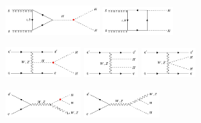 \begin{figure}[ht]
\captionsetup[subfigure]{justification=centering}
    \centering
      \begin{subfigure}{\textwidth}
  \centering
          \caption{}
\includegraphics[width=0.40\textwidth]{Figures/HiggsPairProduction/ggf1.png}
\includegraphics[width=0.30\textwidth]{Figures/HiggsPairProduction/ggf2.png}\\
      \end{subfigure}
      \begin{subfigure}{\textwidth}
  \centering
          \caption{}
\includegraphics[width=0.32\textwidth]{Figures/HiggsPairProduction/vbf2.png}
\includegraphics[width=0.23\textwidth]{Figures/HiggsPairProduction/vbf1.png}
\includegraphics[width=0.23\textwidth]{Figures/HiggsPairProduction/vbf3.png}\\
      \end{subfigure}
      \begin{subfigure}{\textwidth}
  \centering
          \caption{}
\includegraphics[width=0.32\textwidth]{Figures/HiggsPairProduction/vhh1.png}
\includegraphics[width=0.32\textwidth]{Figures/HiggsPairProduction/vhh2.png}

\end{subfigure}
\end{figure}
